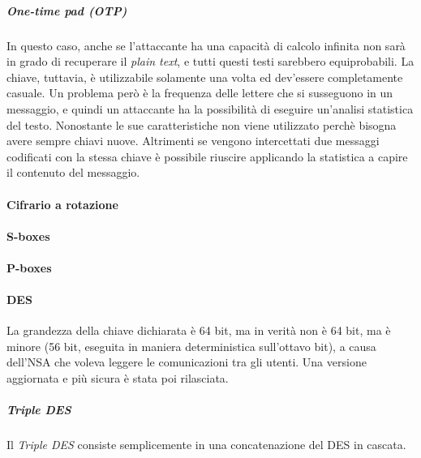 \subparagraph*{One-time pad (OTP)}
In questo caso, anche se l'attaccante ha una capacità di calcolo infinita non 
sarà in grado di recuperare il \textit{plain text}, e tutti questi testi 
sarebbero equiprobabili. La chiave, tuttavia, è utilizzabile solamente una volta 
ed dev'essere completamente casuale.
Un problema però è la frequenza delle lettere che si susseguono in un messaggio, 
e quindi un attaccante ha la possibilità di eseguire un'analisi statistica del 
testo.
Nonostante le sue caratteristiche non viene utilizzato perchè bisogna avere 
sempre chiavi nuove. Altrimenti se vengono intercettati due messaggi codificati 
con la stessa chiave è possibile riuscire applicando la statistica a capire il 
contenuto del messaggio.


\paragraph{Cifrario a rotazione}


\paragraph{S-boxes}


\paragraph{P-boxes}


\paragraph{DES}


La grandezza della chiave dichiarata è 64 bit, ma in verità non è 64 bit, ma è 
minore (56 bit, eseguita in maniera deterministica sull'ottavo bit), a causa 
dell'NSA che voleva leggere le comunicazioni tra gli utenti. Una versione 
aggiornata e più sicura è stata poi rilasciata.

\subparagraph*{Triple DES}

Il \textit{Triple DES} consiste semplicemente in una concatenazione del DES in 
cascata.

